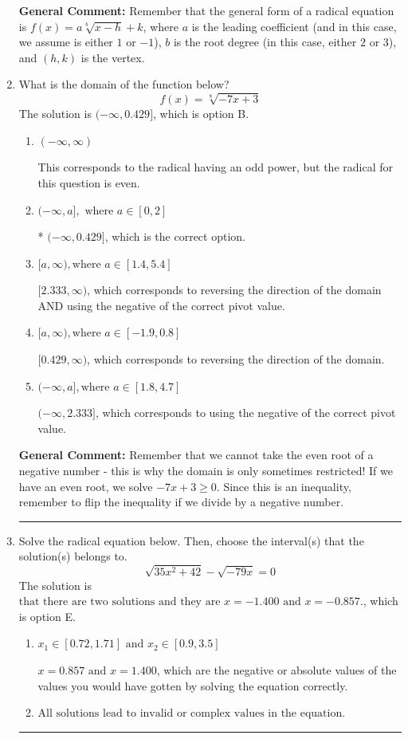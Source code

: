 \documentclass{extbook}[14pt]
\newcommand{\litem}[1]{\item #1

\rule{\textwidth}{0.4pt}}
\begin{document}
\begin{enumerate}
{\textbf{General Comment:} Remember that the general form of a radical equation is $ f(x) = a \sqrt[b]{x - h} + k$, where $a$ is the leading coefficient (and in this case, we assume is either $1$ or $-1$), $b$ is the root degree (in this case, either $2$ or $3$), and $(h, k)$ is the vertex.
}
\litem{
What is the domain of the function below?
\[ f(x) = \sqrt[8]{-7 x + 3} \]The solution is \( (-\infty, 0.429] \), which is option B.\begin{enumerate}[label=\Alph*.]
\item \( (-\infty, \infty) \)

This corresponds to the radical having an odd power, but the radical for this question is even.
\item \( (-\infty, a], \text{ where } a \in [0, 2] \)

* $(-\infty, 0.429]$, which is the correct option.
\item \( [a, \infty), \text{where } a \in [1.4, 5.4] \)

$[2.333, \infty)$, which corresponds to reversing the direction of the domain AND using the negative of the correct pivot value.
\item \( [a, \infty), \text{where } a \in [-1.9, 0.8] \)

 $[0.429, \infty)$, which corresponds to reversing the direction of the domain.
\item \( (-\infty, a], \text{where } a \in [1.8, 4.7] \)

$(-\infty, 2.333]$, which corresponds to using the negative of the correct pivot value.
\end{enumerate}

\textbf{General Comment:} Remember that we cannot take the even root of a negative number - this is why the domain is only sometimes restricted! If we have an even root, we solve $-7 x + 3 \geq 0$. Since this is an inequality, remember to flip the inequality if we divide by a negative number.
}
\litem{
Solve the radical equation below. Then, choose the interval(s) that the solution(s) belongs to.
\[ \sqrt{35 x^2 + 42} - \sqrt{-79 x} = 0 \]The solution is \( \text{that there are two solutions and they are } x = -1.400 \text{ and } x = -0.857. \), which is option E.\begin{enumerate}[label=\Alph*.]
\item \( x_1 \in [0.72, 1.71] \text{ and } x_2 \in [0.9,3.5] \)

$x = 0.857 \text{ and } x = 1.400$, which are the negative or absolute values of the values you would have gotten by solving the equation correctly.
\item \( \text{All solutions lead to invalid or complex values in the equation.} \)


\end{enumerate}}
\end{enumerate}
\end{document}
